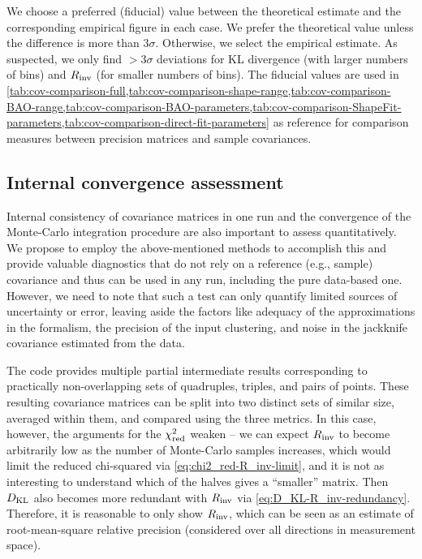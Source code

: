 We choose a preferred (fiducial) value between the theoretical estimate and the corresponding empirical figure in each case.
We prefer the theoretical value unless the difference is more than $3\sigma$.
Otherwise, we select the empirical estimate.
As suspected, we only find $>3\sigma$ deviations for KL divergence (with larger numbers of bins) and $R_{\rm inv}$ (for smaller numbers of bins).
The fiducial values are used in \cref{tab:cov-comparison-full,tab:cov-comparison-shape-range,tab:cov-comparison-BAO-range,tab:cov-comparison-BAO-parameters,tab:cov-comparison-ShapeFit-parameters,tab:cov-comparison-direct-fit-parameters} as reference for comparison measures between \rascalc{} precision matrices and sample covariances.

\subsection{Internal convergence assessment}
\label{subsec:internal-convergence-metrics}

Internal consistency of \rascalc{} covariance matrices in one run and the convergence of the Monte-Carlo integration procedure are also important to assess quantitatively.
We propose to employ the above-mentioned methods to accomplish this and provide valuable diagnostics that do not rely on a reference (e.g., sample) covariance and thus can be used in any run, including the pure data-based one.
However, we need to note that such a test can only quantify limited sources of uncertainty or error, leaving aside the factors like adequacy of the approximations in the formalism, the precision of the input clustering, and noise in the jackknife covariance estimated from the data.

The \rascalc{} code provides multiple partial intermediate results corresponding to practically non-overlapping sets of quadruples, triples, and pairs of points.
These resulting covariance matrices can be split into two distinct sets of similar size, averaged within them, and compared using the three metrics.
In this case, however, the arguments for the $\chi^2_{\rm red}$ weaken -- we can expect $R_{\rm inv}$ to become arbitrarily low as the number of Monte-Carlo samples increases, which would limit the reduced chi-squared via \cref{eq:chi2_red-R_inv-limit}, and it is not as interesting to understand which of the halves gives a ``smaller'' matrix.
Then $D_{\rm KL}$ also becomes more redundant with $R_{\rm inv}$ via \cref{eq:D_KL-R_inv-redundancy}.
Therefore, it is reasonable to only show $R_{\rm inv}$, which can be seen as an estimate of root-mean-square relative precision (considered over all directions in measurement space).


